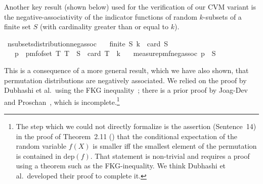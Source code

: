 Another key result (shown below) used for the verification of our CVM variant is the negative-associativity of the indicator functions of random $k$-subsets of a finite set $S$ (with cardinality greater than or equal to $k$).
\begin{isabelle_cm}
\isamarkupfalse%
\ n{\isacharunderscore}{\kern0pt}subsets{\isacharunderscore}{\kern0pt}distribution{\isacharunderscore}{\kern0pt}neg{\isacharunderscore}{\kern0pt}assoc{\isacharcolon}{\kern0pt}\isanewline
\ \ \ {\isacartoucheopen}finite\ S{\isacartoucheclose}\ {\isacartoucheopen}k\ {\isasymle}\ card\ S{\isacartoucheclose}\isanewline
\ \ \ {\isacartoucheopen}p\ {\isasymequiv}\ pmf{\isacharunderscore}{\kern0pt}of{\isacharunderscore}{\kern0pt}set\ {\isacharbraceleft}{\kern0pt}T{\isachardot}{\kern0pt}\ T\ {\isasymsubseteq}\ S\ {\isasymand}\ card\ T\ {\isacharequal}{\kern0pt}\ k{\isacharbraceright}{\kern0pt}{\isacartoucheclose}\isanewline
\ \ \ {\isacartoucheopen}measure{\isacharunderscore}{\kern0pt}pmf{\isachardot}{\kern0pt}neg{\isacharunderscore}{\kern0pt}assoc\ p\ {\isacharparenleft}{\kern0pt}{\isasymin}{\isacharparenright}{\kern0pt}\ S{\isacartoucheclose}
\end{isabelle_cm}
This is a consequence of a more general result, which we have also shown, that permutation distributions are negatively associated.
We relied on the proof by Dubhashi et al.\ using the FKG inequality~\cite[Th. 10]{dubhashi1996}; there is a prior proof by Joag-Dev and Proschan~\cite[Th. 2.11]{joagdev1983}, which is incomplete.\footnote{The step which we could not directly formalize is the assertion (Sentence~14) in the proof of Theorem~2.11 (\cite{joagdev1983}) that the conditional expectation of the random variable $f(X)$ is smaller iff the smallest element of the permutation is contained in $\mathrm{dep}(f)$. That statement is non-trivial and requires a proof using a theorem such as the FKG-inequality. We think Dubhashi et al.\ developed their proof to complete it.}
